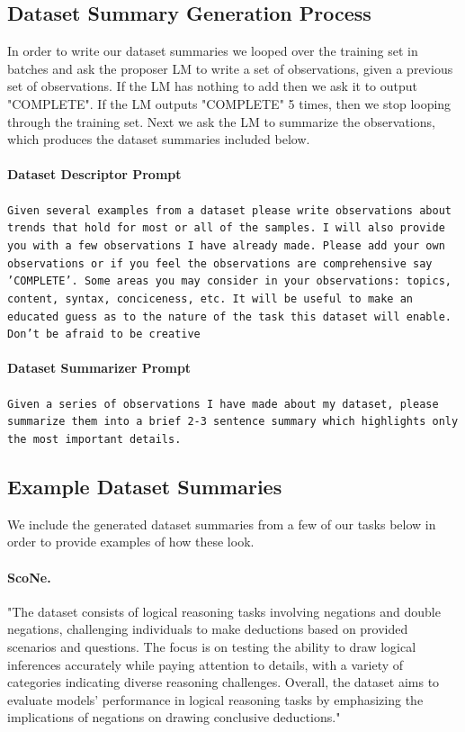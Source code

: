 \subsection{Dataset Summary Generation Process} In order to write our dataset summaries we looped over the training set in batches and ask the proposer LM to write a set of observations, given a previous set of observations.  If the LM has nothing to add then we ask it to output "COMPLETE".  If the LM outputs "COMPLETE" 5 times, then we stop looping through the training set.  Next we ask the LM to summarize the observations, which produces the dataset summaries included below.

\paragraph{Dataset Descriptor Prompt}
\texttt{Given several examples from a dataset please write observations about trends that hold for most or all of the samples. I will also provide you with a few observations I have already made. Please add your own observations or if you feel the observations are comprehensive say 'COMPLETE'. Some areas you may consider in your observations: topics, content, syntax, conciceness, etc. It will be useful to make an educated guess as to the nature of the task this dataset will enable. Don't be afraid to be creative}

\paragraph{Dataset Summarizer Prompt}
\texttt{Given a series of observations I have made about my dataset, please summarize them into a brief 2-3 sentence summary which highlights only the most important details.}

\subsection{Example Dataset Summaries}

We include the generated dataset summaries from a few of our tasks below in order to provide examples of how these look.

\paragraph{ScoNe.} "The dataset consists of logical reasoning tasks involving negations and double negations, challenging individuals to make deductions based on provided scenarios and questions. The focus is on testing the ability to draw logical inferences accurately while paying attention to details, with a variety of categories indicating diverse reasoning challenges. Overall, the dataset aims to evaluate models' performance in logical reasoning tasks by emphasizing the implications of negations on drawing conclusive deductions."


